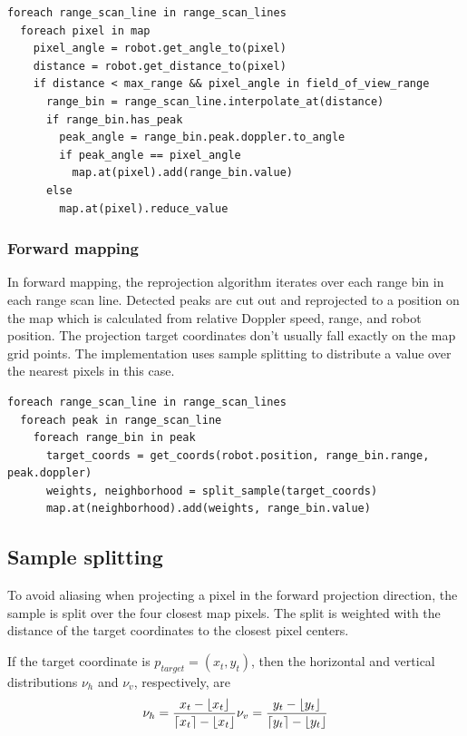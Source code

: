 \begin{verbatim}
foreach range_scan_line in range_scan_lines
  foreach pixel in map
    pixel_angle = robot.get_angle_to(pixel)
    distance = robot.get_distance_to(pixel)
    if distance < max_range && pixel_angle in field_of_view_range
      range_bin = range_scan_line.interpolate_at(distance)
      if range_bin.has_peak
        peak_angle = range_bin.peak.doppler.to_angle
        if peak_angle == pixel_angle
          map.at(pixel).add(range_bin.value)
      else
        map.at(pixel).reduce_value
\end{verbatim}

\subsubsection{Forward mapping}\label{forward-mapping}

In forward mapping, the reprojection algorithm iterates over each range
bin in each range scan line. Detected peaks are cut out and reprojected
to a position on the map which is calculated from relative Doppler
speed, range, and robot position. The projection target coordinates
don't usually fall exactly on the map grid points. The implementation
uses sample splitting to distribute a value over the nearest pixels in
this case.

\begin{verbatim}
foreach range_scan_line in range_scan_lines
  foreach peak in range_scan_line
    foreach range_bin in peak
      target_coords = get_coords(robot.position, range_bin.range, peak.doppler)
      weights, neighborhood = split_sample(target_coords)
      map.at(neighborhood).add(weights, range_bin.value)
\end{verbatim}

\subsection{Sample splitting}\label{sample-splitting}

To avoid aliasing when projecting a pixel in the forward projection
direction, the sample is split over the four closest map pixels. The
split is weighted with the distance of the target coordinates to the
closest pixel centers.

If the target coordinate is \(p_{target}=(x_t, y_t)\), then the
horizontal and vertical distributions \(\nu_h\) and \(\nu_v\),
respectively, are \[
\nu_h = \frac{x_t - \lfloor x_t \rfloor}{\lceil x_t \rceil - \lfloor x_t \rfloor} \\
\nu_v = \frac{y_t - \lfloor y_t \rfloor}{\lceil y_t \rceil - \lfloor y_t \rfloor}
\]


